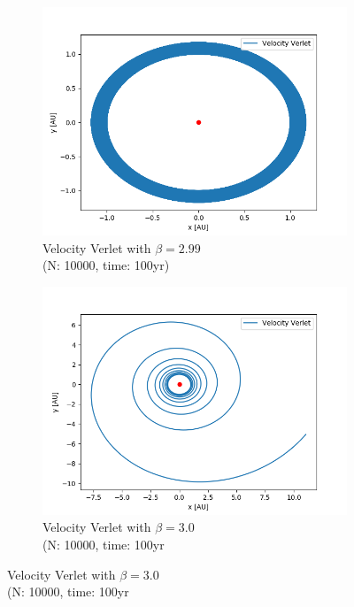 \documentclass{article}
\begin{document}
\begin{figure}[H]
  \centering
  \begin{subfigure}{0.5\textwidth}
    \centering
    \includegraphics[width=1.0\textwidth]{plots/beta_2p99.png}
    \caption{Velocity Verlet with $\beta =2.99$ \\(N: 10000, time: 100yr)}
  \end{subfigure}%
  \begin{subfigure}{0.5\textwidth}
    \centering
    \includegraphics[width=1.0\textwidth]{plots/beta_3.png}
    \caption{Velocity Verlet with $\beta =3.0$ \\(N: 10000, time: 100yr}  
  \end{subfigure}
\end{figure}
\end{document}
